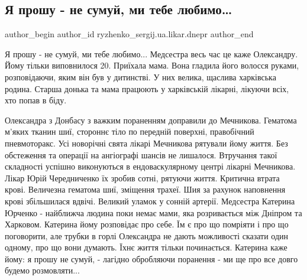  
 
 
 
 

\subsection{Я прошу - не сумуй,  ми тебе любимо…}
\label{sec:03_01_2023.fb.ryzhenko_sergij.ua.likar.dnepr.1.ya_proshu___ne_sumui}

\ifcmt
 author_begin
   author_id ryzhenko_sergij.ua.likar.dnepr
 author_end
\fi

\obeycr
Я прошу - не сумуй,  ми тебе любимо...
Медсестра весь час це каже Олександру.
Йому тільки виповнилося 20.
Приїхала мама.
Вона гладила його волосся руками, розповідаючи, яким він був у дитинстві.
У них велика, щаслива харківська родина.
Старша донька та мама працюють у харківській лікарні, лікуючи всіх, хто попав в біду.
\restorecr

\obeycr
Олександра з Донбасу з важким пораненням доправили до Мечникова.
Гематома м'яких тканин шиї, стороннє тіло по передній поверхні, правобічний пневмоторакс.
Усі новорічні свята лікарі Мечникова рятували йому життя.
Без обстеження та операції на ангіографі шансів не лишалося.
Втручання такої складності успішно виконуються в ендоваскулярному центрі лікарні Мечникова. 
Лікар Юрій Чередниченко їх зробив сотні, рятуючи життя. 
Критична втрата крові.
Величезна гематома шиї, зміщення трахеї.
Шия за рахунок наповнення крові збільшилася вдвічі.
Великий уламок у сонній артерії.
Медсестра Катерина Юрченко - найближча людина поки немає мами, яка розривається між Дніпром та Харковом.
Катерина йому розповідає про себе.
Їм є про що помріяти і про що поговорити, але трубки в горлі Олександра не дають можливості сказати один одному, про що вони думають.
Їхнє життя тільки починається.
Катерина каже йому: я прошу не сумуй, - лагідно обробляючи поранення - ми ще про все довго будемо розмовляти...
\restorecr

